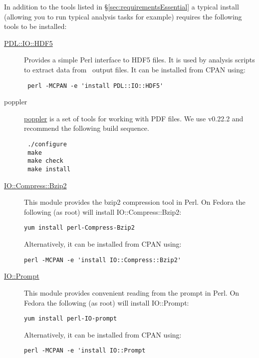 In addition to the tools listed in \S\ref{sec:requirementsEssential} a typical install (allowing you to run typical analysis tasks for example) requires the following tools to be installed:

\begin{description}
\item [\href{http://search.cpan.org/~chm/PDL-IO-HDF5-0.6501/hdf5.pd}{{\normalfont \ttfamily PDL::IO::HDF5}}] Provides a simple Perl interface to HDF5 files. It is used by analysis scripts to extract data from \glc\ output files. It can be installed from CPAN using:
\begin{verbatim}
 perl -MCPAN -e 'install PDL::IO::HDF5'
\end{verbatim}

\item [poppler] \href{http://poppler.freedesktop.org/}{poppler} is a set of tools for working with PDF files. We use v0.22.2 and recommend the following build sequence. 
\begin{verbatim}
 ./configure
 make
 make check
 make install
\end{verbatim}

  \item [\href{http://perldoc.perl.org/IO/Compress/Bzip2.html}{{\normalfont \ttfamily IO::Compress::Bzip2}}] This module provides the {\normalfont \ttfamily bzip2} compression tool in Perl. On Fedora the following (as root) will install {\normalfont \ttfamily IO::Compress::Bzip2}:
\begin{verbatim}
yum install perl-Compress-Bzip2
\end{verbatim}
Alternatively, it can be installed from CPAN using:
\begin{verbatim}
perl -MCPAN -e 'install IO::Compress::Bzip2'
\end{verbatim}

  \item [\href{http://search.cpan.org/~dconway/IO-Prompt-0.997002/lib/IO/Prompt.pm}{{\normalfont \ttfamily IO::Prompt}}] This module provides convenient reading from the prompt in Perl. On Fedora the following (as root) will install {\normalfont \ttfamily IO::Prompt}:
\begin{verbatim}
yum install perl-IO-prompt
\end{verbatim}
Alternatively, it can be installed from CPAN using:
\begin{verbatim}
perl -MCPAN -e 'install IO::Prompt
\end{verbatim}


\end{description}
